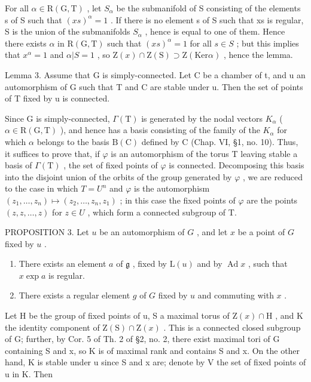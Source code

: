 For all \(\alpha\in\mathrm{R}(\mathrm{G},\mathrm{T})\) , let \(S_{\alpha}\) be the submanifold of S consisting of the elements s of S such that \((xs)^{\alpha}=1\) . If there is no element s of S such that xs is regular, S is the union of the submanifolds \(S_{\alpha}\) , hence is equal to one of them. Hence there exists \(\alpha\) in \(\mathrm{R}(\mathrm{G},\mathrm{T})\) such that \((xs)^{\alpha}=1\) for all \(s\in S\) ; but this implies that \(x^{\alpha}=1\) and \(\alpha|S=1\) , so \(\mathrm{Z}(x)\cap\mathrm{Z}(\mathrm{S})\supset\mathrm{Z}(\mathrm{Ker}\alpha)\) , hence the lemma.

Lemma 3. Assume that G is simply-connected. Let C be a chamber of t, and u an automorphism of G such that T and C are stable under u. Then the set of points of T fixed by u is connected.

Since G is simply-connected, \(\varGamma(\mathrm{T})\) is generated by the nodal vectors \(K_{\alpha}\) ( \(\alpha \in \mathrm{R}(\mathrm{G}, \mathrm{T})\) ), and hence has a basis consisting of the family of the \(K_{\alpha}\) for which \(\alpha\) belongs to the basis \(\mathrm{B}(\mathrm{C})\) defined by C (Chap. VI, §1, no. 10). Thus, it suffices to prove that, if \(\varphi\) is an automorphism of the torus T leaving stable a basis of \(\varGamma(\mathrm{T})\) , the set of fixed points of \(\varphi\) is connected. Decomposing this basis into the disjoint union of the orbits of the group generated by \(\varphi\) , we are reduced to the case in which \(T = U^{n}\) and \(\varphi\) is the automorphism \((z_{1}, \ldots, z_{n}) \mapsto (z_{2}, \ldots, z_{n}, z_{1})\) ; in this case the fixed points of \(\varphi\) are the points \((z, z, \ldots, z)\) for \(z \in U\) , which form a connected subgroup of T.

PROPOSITION 3. Let \(u\) be an automorphism of \(G\) , and let \(x\) be a point of \(G\) fixed by \(u\) .

\begin{enumerate}
\def\labelenumi{\alph{enumi})}
\item
  There exists an element \(a\) of \(\mathfrak{g}\) , fixed by \(\mathrm{L}(u)\) and by \(\operatorname{Ad} x\) , such that \(x \exp a\) is regular.
\item
  There exists a regular element \(g\) of \(G\) fixed by \(u\) and commuting with \(x\) .
\end{enumerate}

Let H be the group of fixed points of u, S a maximal torus of \(\mathrm{Z}(x)\cap\mathrm{H}\) , and K the identity component of \(\mathrm{Z}(\mathrm{S})\cap\mathrm{Z}(x)\) . This is a connected closed subgroup of G; further, by Cor. 5 of Th. 2 of §2, no. 2, there exist maximal tori of G containing S and x, so K is of maximal rank and contains S and x. On the other hand, K is stable under u since S and x are; denote by V the set of fixed points of u in K. Then

